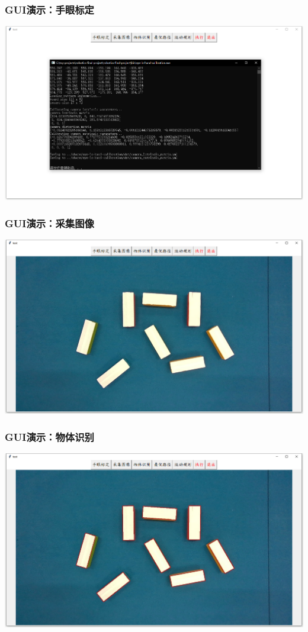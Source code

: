 \documentclass{beamer}
\begin{document}
\begin{frame}
    \frametitle{GUI演示：手眼标定}
    \centering
    \includegraphics[scale=0.25]{手眼标定.png}
\end{frame}

\begin{frame}
    \frametitle{GUI演示：采集图像}
    \centering
    \includegraphics[scale=0.25]{采集图像.png}
\end{frame}

\begin{frame}
    \frametitle{GUI演示：物体识别}
    \centering
    \includegraphics[scale=0.25]{物体识别.png}
\end{frame}
\end{document}
